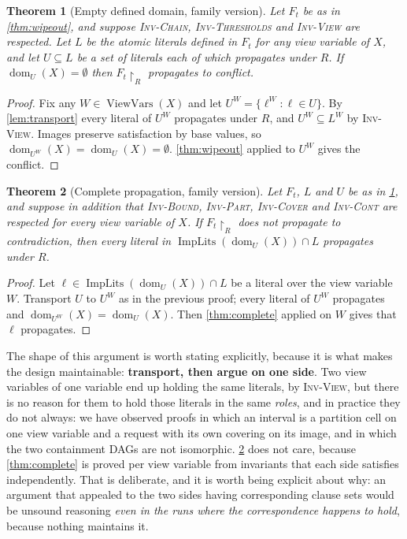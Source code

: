\documentclass[11pt,a4paper]{article}
\theoremstyle{plain}
\newtheorem{theoremP}{Theorem}
\theoremstyle{definition}
\theoremstyle{remark}
\newcommand{\fname}[1]{\ensuremath{\operatorname{#1}}}
\newcommand{\ViewVars}{\fname{ViewVars}}
\newcommand{\dm}{\fname{dom}}
\newcommand{\ImpLits}{\fname{ImpLits}}
\newcommand{\inv}[1]{\textnormal{\textsc{Inv-#1}}}
\newcommand{\invChain}{\inv{Chain}}
\newcommand{\invThresholds}{\inv{Thresholds}}
\newcommand{\invPart}{\inv{Part}}
\newcommand{\invCover}{\inv{Cover}}
\newcommand{\invCont}{\inv{Cont}}
\newcommand{\invView}{\inv{View}}
\begin{document}
\setcounter{theoremP}{1}
\begin{theoremP}[Empty defined domain, family version]
\label{thm:wipeout-family}
Let $F_t$ be as in \cref{thm:wipeout}, and suppose \invChain{}, \invThresholds{} and
\invView{} are respected.  Let $L$ be the atomic literals defined in $F_t$ for
any view variable of $X$, and let $U\subseteq L$ be a set of literals each of
which propagates under $R$.  If $\dm_U(X)=\emptyset$ then
$F_t\!\restriction_R$ propagates to conflict.
\end{theoremP}

\begin{proof}
Fix any $W\in\ViewVars(X)$ and let $U^W = \{\ell^{W} : \ell\in U\}$.  By
\cref{lem:transport} every literal of $U^{W}$ propagates under $R$, and
$U^W\subseteq L^W$ by \invView{}.  Images preserve satisfaction by base values,
so $\dm_{U^W}(X)=\dm_U(X)=\emptyset$.  \cref{thm:wipeout} applied to $U^W$ gives
the conflict.
\end{proof}

\begin{theoremP}[Complete propagation, family version]
\label{thm:complete-family}
Let $F_t$, $L$ and $U$ be as in \cref{thm:wipeout-family}, and suppose in
addition that \inv{Bound}, \invPart{}, \invCover{} and \invCont{} are respected
for every view variable of $X$.  If $F_t\!\restriction_R$ does not propagate to
contradiction, then every literal in $\ImpLits(\dm_U(X))\cap L$ propagates
under $R$.
\end{theoremP}

\begin{proof}
Let $\ell\in\ImpLits(\dm_U(X))\cap L$ be a literal over the view variable $W$.
Transport $U$ to $U^{W}$ as in the previous proof; every literal of $U^W$
propagates and $\dm_{U^W}(X)=\dm_U(X)$.  Then \cref{thm:complete} applied on
$W$ gives that $\ell$ propagates.
\end{proof}

The shape of this argument is worth stating explicitly, because it is what makes
the design maintainable: \textbf{transport, then argue on one side}.  Two
view variables of one variable end up holding the same literals, by \invView{},
but there is no reason for them to hold those literals in the same \emph{roles},
and in practice they do not always: we have observed proofs in which an interval
is a partition cell on one view variable and a request with its own covering on
its image, and in which the two containment DAGs are not isomorphic.
\cref{thm:complete-family} does not care, because \cref{thm:complete} is proved
per view variable from invariants that each side satisfies independently.  That
is deliberate, and it is worth being explicit about why: an argument that
appealed to the two sides having corresponding clause sets would be unsound
reasoning \emph{even in the runs where the correspondence happens to hold},
because nothing maintains it.
\end{document}
